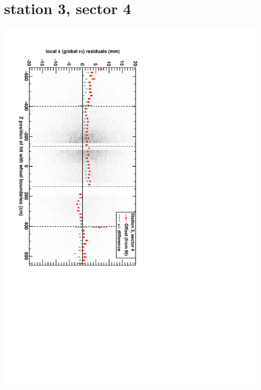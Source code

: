 \documentclass[compress]{beamer}
\begin{document}
\section*{station 3, sector 4}
\begin{frame} \vfill \mbox{\hspace{-1 cm}\includegraphics[height=1.2\linewidth, angle=90]{DTrphiVsZ_st3_sr04.pdf}} \end{frame}
\end{document}
